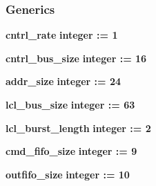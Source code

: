 \subsubsection*{Generics}
 \begin{DoxyCompactItemize}
\item 
{\bf cntrl\+\_\+rate} {\bfseries {\bfseries \textcolor{comment}{integer}\textcolor{vhdlchar}{ }\textcolor{vhdlchar}{ }\textcolor{vhdlchar}{\+:}\textcolor{vhdlchar}{=}\textcolor{vhdlchar}{ }\textcolor{vhdlchar}{ } \textcolor{vhdldigit}{1} \textcolor{vhdlchar}{ }}}
\item 
{\bf cntrl\+\_\+bus\+\_\+size} {\bfseries {\bfseries \textcolor{comment}{integer}\textcolor{vhdlchar}{ }\textcolor{vhdlchar}{ }\textcolor{vhdlchar}{\+:}\textcolor{vhdlchar}{=}\textcolor{vhdlchar}{ }\textcolor{vhdlchar}{ } \textcolor{vhdldigit}{16} \textcolor{vhdlchar}{ }}}
\item 
{\bf addr\+\_\+size} {\bfseries {\bfseries \textcolor{comment}{integer}\textcolor{vhdlchar}{ }\textcolor{vhdlchar}{ }\textcolor{vhdlchar}{\+:}\textcolor{vhdlchar}{=}\textcolor{vhdlchar}{ }\textcolor{vhdlchar}{ } \textcolor{vhdldigit}{24} \textcolor{vhdlchar}{ }}}
\item 
{\bf lcl\+\_\+bus\+\_\+size} {\bfseries {\bfseries \textcolor{comment}{integer}\textcolor{vhdlchar}{ }\textcolor{vhdlchar}{ }\textcolor{vhdlchar}{\+:}\textcolor{vhdlchar}{=}\textcolor{vhdlchar}{ }\textcolor{vhdlchar}{ } \textcolor{vhdldigit}{63} \textcolor{vhdlchar}{ }}}
\item 
{\bf lcl\+\_\+burst\+\_\+length} {\bfseries {\bfseries \textcolor{comment}{integer}\textcolor{vhdlchar}{ }\textcolor{vhdlchar}{ }\textcolor{vhdlchar}{\+:}\textcolor{vhdlchar}{=}\textcolor{vhdlchar}{ }\textcolor{vhdlchar}{ } \textcolor{vhdldigit}{2} \textcolor{vhdlchar}{ }}}
\item 
{\bf cmd\+\_\+fifo\+\_\+size} {\bfseries {\bfseries \textcolor{comment}{integer}\textcolor{vhdlchar}{ }\textcolor{vhdlchar}{ }\textcolor{vhdlchar}{\+:}\textcolor{vhdlchar}{=}\textcolor{vhdlchar}{ }\textcolor{vhdlchar}{ } \textcolor{vhdldigit}{9} \textcolor{vhdlchar}{ }}}
\item 
{\bf outfifo\+\_\+size} {\bfseries {\bfseries \textcolor{comment}{integer}\textcolor{vhdlchar}{ }\textcolor{vhdlchar}{ }\textcolor{vhdlchar}{\+:}\textcolor{vhdlchar}{=}\textcolor{vhdlchar}{ }\textcolor{vhdlchar}{ } \textcolor{vhdldigit}{10} \textcolor{vhdlchar}{ }}}
\end{DoxyCompactItemize}
